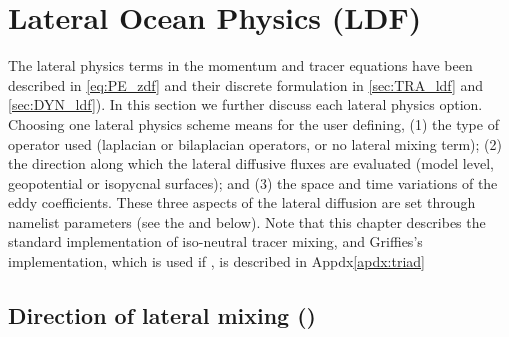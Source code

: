 \documentclass[../main/NEMO_manual]{subfiles}
\begin{document}
\chapter{Lateral Ocean Physics (LDF)}
\label{chap:LDF}

\minitoc

\newpage

The lateral physics terms in the momentum and tracer equations have been described in \autoref{eq:PE_zdf} and
their discrete formulation in \autoref{sec:TRA_ldf} and \autoref{sec:DYN_ldf}).
In this section we further discuss each lateral physics option.
Choosing one lateral physics scheme means for the user defining,
(1) the type of operator used (laplacian or bilaplacian operators, or no lateral mixing term);
(2) the direction along which the lateral diffusive fluxes are evaluated
(model level, geopotential or isopycnal surfaces); and
(3) the space and time variations of the eddy coefficients.
These three aspects of the lateral diffusion are set through namelist parameters
(see the \textit{} and \textit{} below).
Note that this chapter describes the standard implementation of iso-neutral tracer mixing,
and Griffies's implementation, which is used if ,
is described in Appdx\autoref{apdx:triad}





\section{Direction of lateral mixing (\protect{})}
\label{sec:LDF_slp}

\end{document}
